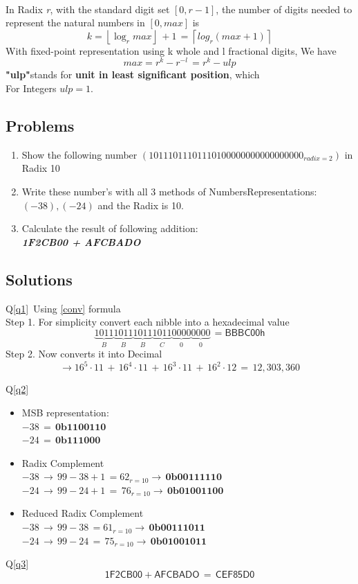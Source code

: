 \paragraph{}
In Radix \textit{r}, with the standard digit set \([0, r - 1]\), the number of digits needed to
represent the natural numbers in \([0, max]\) is \[
	\mathit{k}= \left\lfloor \log_{r}max\right\rfloor\, + 1 \,= \left\lceil log_{r}(max+1)\right\rceil
\]
With fixed-point representation using k whole and l fractional digits, We have
\[
	max = r^{k}-r^{-l}\,=r^{k} - ulp
\]
\textbf{"ulp"}stands for \textbf{unit in least significant position}, which \\For Integers \( ulp = 1 \).
\\ 
\newpage
\subsection{Problems}
\begin{enumerate}
	\item  Show the following number \label{q1} \(\left(1011 1011 1011 1010 0000  0000 0000 0000_{radix=2}\right)\) in Radix 10
	\item Write these number's with all 3 methods of Numbers\linebreak Representations: \((-38),\left(-24\right)\) and the Radix is 10.\label{q2}
	\item Calculate the result of following addition:\\
	\textbf{\textit{1F2CB00 + AFCBADO}}\label{q3}
\end{enumerate}
\subsection{Solutions}
Q\ref{q1}\, Using \eqref{conv} formula \\ 
Step 1. For simplicity convert each nibble into a hexadecimal value
\[
	\underbrace{1011}_{B}\underbrace{1011}_{B}\underbrace{1011}_{B}\underbrace{1011}_{C}\underbrace{0000}_{0}\underbrace{0000}_{0}\,=\mathsf{BBBC00h}
\]
Step 2. Now converts it into Decimal
\[
	\rightarrow 16^{5}\cdot11\,+\,16^{4}\cdot11\,+\,16^{3}\cdot11\,+\,16^{2}\cdot12\,=\,12,303,360
\]

Q\ref{q2} \begin{itemize}
	\item MSB representation: \\
	\(-38\,=\,\mathbf{0b1100110}\)\\
	\(-24\,=\,\mathbf{0b111000}\)
	\item Radix Complement \\
	\(-38\,\rightarrow\,99-38+1\,=62_{r=10}\rightarrow\,\mathbf{0b0011 1110}\)\\
	\(-24\,\rightarrow\,99-24+1\,=\,76_{r=10}\rightarrow\,\mathbf{0b0100 1100}\)\\
	\item Reduced Radix Complement\\
	\(-38\,\rightarrow\,99-38\,=61_{r=10}\rightarrow\,\mathbf{0b0011 1011}\)\\
	\(-24\,\rightarrow\,99-24\,=\,75_{r=10}\rightarrow\,\mathbf{0b0100 1011}\)\\
\end{itemize}
Q\ref{q3}
\[
\mathsf{1F2CB00 + AFCBADO\,=\,CEF85D0}
\]

